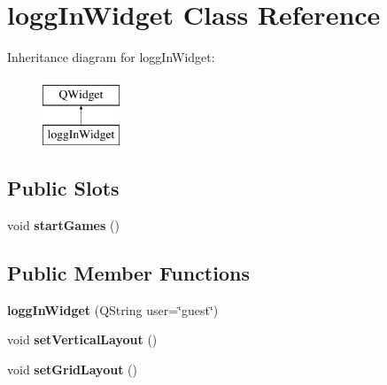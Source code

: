 \hypertarget{classloggInWidget}{\section{logg\-In\-Widget Class Reference}
\label{classloggInWidget}
}
Inheritance diagram for logg\-In\-Widget\-:\begin{figure}[H]
\begin{center}
\leavevmode
\includegraphics[height=2.000000cm]{classloggInWidget}
\end{center}
\end{figure}
\subsection*{Public Slots}
\begin{DoxyCompactItemize}
\item 
\hypertarget{classloggInWidget_abcc1aa0d2f8ecdee120a3b0461086ce0}{void {\bfseries start\-Games} ()}\label{classloggInWidget_abcc1aa0d2f8ecdee120a3b0461086ce0}

\end{DoxyCompactItemize}
\subsection*{Public Member Functions}
\begin{DoxyCompactItemize}
\item 
\hypertarget{classloggInWidget_a04dcda82efc89df69c734e5077ad564e}{{\bfseries logg\-In\-Widget} (Q\-String user=\char`\"{}guest\char`\"{})}\label{classloggInWidget_a04dcda82efc89df69c734e5077ad564e}

\item 
\hypertarget{classloggInWidget_ab3c883a2d4741be42d58bc2841b19d4c}{void {\bfseries set\-Vertical\-Layout} ()}\label{classloggInWidget_ab3c883a2d4741be42d58bc2841b19d4c}

\item 
\hypertarget{classloggInWidget_a3c068d2539ba9a9932d5144d6b0888bc}{void {\bfseries set\-Grid\-Layout} ()}\label{classloggInWidget_a3c068d2539ba9a9932d5144d6b0888bc}

\end{DoxyCompactItemize}
